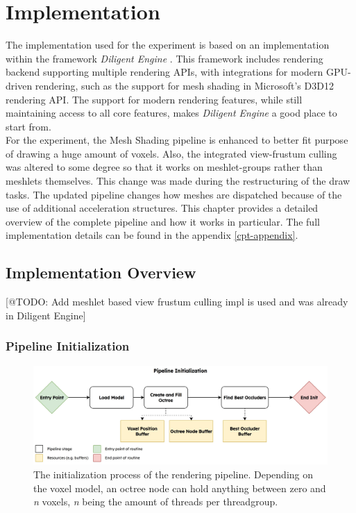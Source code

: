 \chapter{Implementation} \label{cpt-implementation}

The implementation used for the experiment is based on an implementation within the framework \emph{Diligent Engine} 
\cite{DiligentGraphicsGitHub, DiligentGraphics}. This framework includes rendering backend supporting 
multiple rendering \ac{API}s, with integrations for modern \ac{GPU}-driven rendering, such as the support for 
mesh shading in Microsoft's D3D12 rendering \ac{API}. The support for modern rendering features, while still 
maintaining access to all core features, makes \emph{Diligent Engine} a good place to start from.\\

\noindent
For the experiment, the Mesh Shading pipeline is enhanced to better fit purpose of drawing a huge amount of voxels. 
Also, the integrated view-frustum culling was altered to some degree so that it works on meshlet-groups rather 
than meshlets themselves. This change was made during the restructuring of the draw tasks. The updated pipeline 
changes how meshes are dispatched because of the use of additional acceleration structures. This chapter provides 
a detailed overview of the complete pipeline and how it works in particular. The full implementation details can be 
found in the appendix \ref{cpt-appendix}.

\section{Implementation Overview} \label{sec-implementation-overview}

[@TODO: Add meshlet based view frustum culling impl is used and was already in Diligent Engine]

\subsection*{Pipeline Initialization} \label{subsec-piepline-initialization}

\begin{figure}[h]
    \centering
    \includegraphics[width=\linewidth]{images/graphics/pipeline-initialization.jpg}
    \caption{The initialization process of the rendering pipeline. Depending on the voxel model, an octree node 
    can hold anything between zero and \emph{n} voxels, \emph{n} being the amount of threads per threadgroup.}
    \label{fig:pipeline-initialization}
\end{figure}

